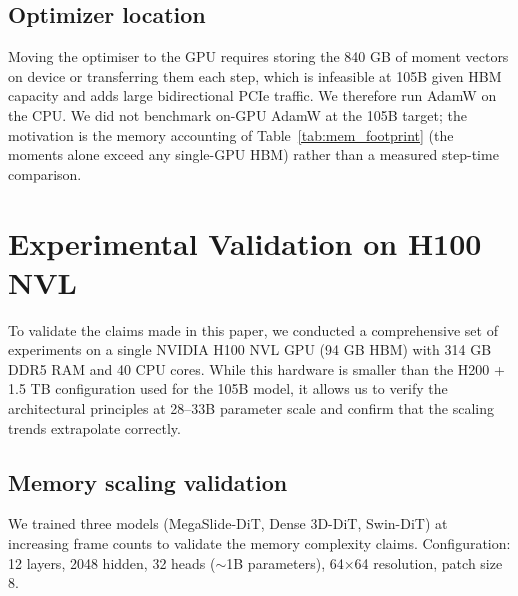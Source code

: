 \documentclass[11pt, letterpaper]{article}
\begin{document}
\subsection{Optimizer location}
Moving the optimiser to the GPU requires storing the 840 GB of moment vectors on device or transferring them each step, which is infeasible at 105B given HBM capacity and adds large bidirectional PCIe traffic. We therefore run AdamW on the CPU. We did not benchmark on-GPU AdamW at the 105B target; the motivation is the memory accounting of Table~\ref{tab:mem_footprint} (the moments alone exceed any single-GPU HBM) rather than a measured step-time comparison.


\section{Experimental Validation on H100 NVL}

To validate the claims made in this paper, we conducted a comprehensive set of experiments on a single NVIDIA H100 NVL GPU (94 GB HBM) with 314 GB DDR5 RAM and 40 CPU cores. While this hardware is smaller than the H200 + 1.5 TB configuration used for the 105B model, it allows us to verify the architectural principles at 28--33B parameter scale and confirm that the scaling trends extrapolate correctly.

\subsection{Memory scaling validation}

We trained three models (MegaSlide-DiT, Dense 3D-DiT, Swin-DiT) at increasing frame counts to validate the memory complexity claims. Configuration: 12 layers, 2048 hidden, 32 heads ($\sim$1B parameters), 64$\times$64 resolution, patch size 8.
\end{document}
